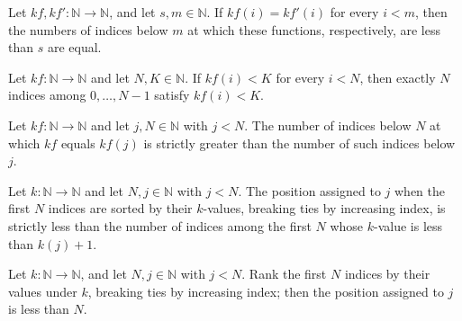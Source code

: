 \begin{theorem}
\label{Light.cntLt_congr}
\leanok
{}
Let $kf,kf':\mathbb{N}\to\mathbb{N}$, and let $s,m\in\mathbb{N}$. If $kf(i)=kf'(i)$ for
every $i<m$, then the numbers of indices below $m$ at which these functions,
respectively, are less than $s$ are equal.
\end{theorem}

\begin{theorem}
\label{Light.cntLt_of_forall_lt}
\leanok
{}
Let $kf:\mathbb{N}\to\mathbb{N}$ and let $N,K\in\mathbb{N}$. If $kf(i)<K$ for every
$i<N$, then exactly $N$ indices among $0,\ldots,N-1$ satisfy $kf(i)<K$.
\end{theorem}

\begin{theorem}
\label{Light.cntEq_lt_of_lt}
\leanok
{}
Let $kf:\mathbb{N}\to\mathbb{N}$ and let $j,N\in\mathbb{N}$ with $j<N$. The number of
indices below $N$ at which $kf$ equals $kf(j)$ is strictly greater than the number of
such indices below $j$.
\end{theorem}

\begin{theorem}
\label{Light.sortPos_lt_cntLt_succ}
\leanok
{}
Let $k:\mathbb{N}\to\mathbb{N}$ and let $N,j\in\mathbb{N}$ with $j<N$. The position
assigned to $j$ when the first $N$ indices are sorted by their $k$-values, breaking ties
by increasing index, is strictly less than the number of indices among the first $N$
whose $k$-value is less than $k(j)+1$.
\end{theorem}

\begin{theorem}
\label{Light.sortPos_lt}
\leanok
{}
Let $k:\mathbb{N}\to\mathbb{N}$, and let $N,j\in\mathbb{N}$ with $j<N$. Rank the first
$N$ indices by their values under $k$, breaking ties by increasing index; then the
position assigned to $j$ is less than $N$.
\end{theorem}

